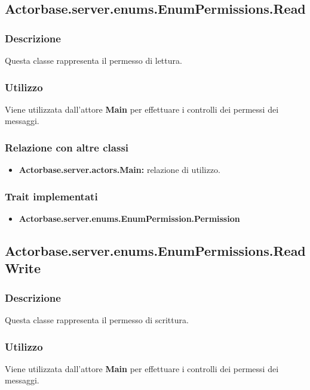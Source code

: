 \documentclass[a4paper]{article}
\begin{document}
				\subsection{Actorbase.server.enums.EnumPermissions.Read}
			\subsubsection{Descrizione}
				Questa classe rappresenta il permesso di lettura.
				
			\subsubsection{Utilizzo}
				Viene utilizzata dall'attore \textbf{Main} per effettuare i controlli dei permessi dei messaggi. 
				
			\subsubsection{Relazione con altre classi}
				\begin{itemize}
					\item \textbf{Actorbase.server.actors.Main:} relazione di utilizzo.
				\end{itemize}
						
			\subsubsection{Trait implementati}
				\begin{itemize}
					\item \textbf{Actorbase.server.enums.EnumPermission.Permission} 
				\end{itemize}
				
		\subsection{Actorbase.server.enums.EnumPermissions.ReadWrite}
			\subsubsection{Descrizione}
				Questa classe rappresenta il permesso di scrittura.
				
			\subsubsection{Utilizzo}
				Viene utilizzata dall'attore \textbf{Main} per effettuare i controlli dei permessi dei messaggi. 
				
\end{document}
